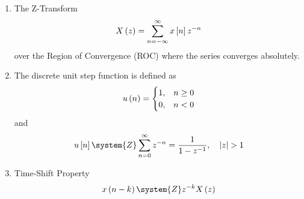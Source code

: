 \begin{enumerate}[label=\thesubsection.\arabic*, ref=\thesubsection.\theenumi,itemsep=0pt]
\begin{itemize}
\item In multi-component conservation and stoichiometric balances, the conservation of elemental species across reactant and product streams is represented by:
\begin{align}
\vec{A}_{\text{reactants}} \vec{x}_{\text{reactants}} = \vec{A}_{\text{products}} \vec{x}_{\text{products}}
\end{align}
Combining both sides into a single stoichiometric matrix yields the homogeneous system:
\begin{align}
\sbrak{\vec{A}_{\text{reactants}} \quad -\vec{A}_{\text{products}}} \vec{x} = \vec{0} \label{eq:EE26BTECH11213-stoich_matrix_homo}
\end{align}
When boundary parameters or specific yields fix certain degrees of freedom (such as basis mole values and yield coefficients), the homogeneous system reduces to a deterministic non-homogeneous matrix equation $\vec{A}\vec{x} = \vec{b}$ that can be solved directly via row operations or symbolic matrix inversion.
\end{itemize}
\fi
\item The Z-Transform
\begin{align}
X\left(z\right) =  \sum_{n=-\infty}^{\infty} x{}\left[n\right] z^{-n} 
\label{eq:EE26BTECH11213-z_transform_def}
\end{align}
over the Region of Convergence (ROC) where the series converges absolutely.
%
\item 
The discrete unit step function  is defined as
\begin{align}
u\left(n\right) = \begin{cases}
1, & n \ge 0 \\
0, & n < 0
\end{cases} \label{eq:EE26BTECH11213-discrete_unit_step}
\end{align}
and 
\begin{align}
	u\sbrak{n} \system{Z} \sum_{n=0}^{\infty} z^{-n} = \frac{1}{1 - z^{-1}}, \quad \abs{z} > 1 \label{eq:EE26BTECH11213-z_step_transform}
\end{align}
%
\item Time-Shift Property
\begin{align}
	x\brak{n - k} \system{Z} z^{-k} X\brak{z} 
	\label{eq:EE26BTECH11213-z_shift_property}
\end{align}


\end{enumerate}
